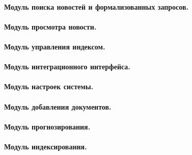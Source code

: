 \clearpage
\paragraph{Модуль поиска новостей и формализованных запросов.} \hfill


\clearpage
\paragraph{Модуль просмотра новости.} \hfill


\clearpage
\paragraph{Модуль управления индексом.} \hfill


\clearpage
\paragraph{Модуль интеграционного интерфейса.} \hfill


\clearpage
\paragraph{Модуль настроек системы.} \hfill


\clearpage
\paragraph{Модуль добавления документов.} \hfill


\clearpage
\paragraph{Модуль прогнозирования.} \hfill


\clearpage
\paragraph{Модуль индексирования.} \hfill
